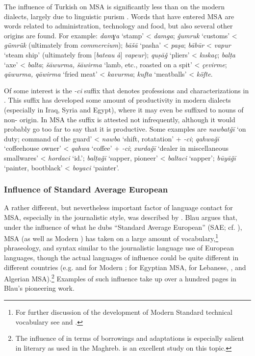 \documentclass[output=paper]{langsci/langscibook}
\begin{document}
The influence of  {Turkish} on MSA is significantly less than on the modern  dialects, largely due to linguistic purism \citep{Procházka2011Turkish}. Words that have entered MSA are words related to administration, technology and food, but also several other origins are found. For example: \textit{damɣa} ‘stamp’ < \textit{damga}; \textit{ǧumruk} ‘customs’ < \textit{gümrük} (ultimately from  \textit{commercium}); \textit{bāšā} ‘pasha’ < \textit{paşa}; \textit{bābūr} < \textit{vapur} ‘steam ship’ (ultimately from  [\textit{bateau} \textit{à}] \textit{vapeur}); \textit{quṣāǧ} ‘pliers’ < \textit{kıskaç}; \textit{balṭa} ‘axe’ < \textit{balta}; \textit{šāwurma,} \textit{šāwirma} ‘lamb, etc., roasted on a spit’ < \textit{çevirme}; \textit{qāwurma,} \textit{qāwirma} ‘fried meat’ < \textit{kavurma}; \textit{kufta} ‘meatballs’ < \textit{köfte}.

Of some interest is the \textit{-ci} suffix that denotes professions and characterizations in . This suffix has developed some amount of productivity in modern dialects (especially in Iraq, Syria and Egypt), where it may even be suffixed to nouns of non- origin. In MSA the suffix is attested not infrequently, although it would probably go too far to say that it is productive. Some examples are \textit{nawbatǧī} ‘on duty; command of the guard’ < \textit{nawba} ‘shift, rotatation’ + \textit{-ci}; \textit{qahwaǧī} ‘coffeehouse owner’ < \textit{qahwa} ‘coffee’ + \textit{-ci}; \textit{xurdaǧī} ‘dealer in miscellaneous smallwares’ < \textit{hordaci} ‘id.’; \textit{balṭaǧī} ‘sapper, pioneer’ < \textit{baltaci} ‘sapper’; \textit{būyāǧī} ‘painter, bootblack’ < \textit{boyaci} ‘painter’.

\subsubsection{Influence of Standard Average European}

A rather different, but nevertheless important factor of language contact for MSA, especially in the journalistic style, was described by \citet{Blau1969}. Blau argues that, under the influence of what he dubs “Standard Average European” (SAE; cf. \citealt{Whorf1956}), MSA (as well as Modern ) has taken on a large amount of vocabulary,\footnote{For further discussion of the development of Modern Standard  technical vocabulary see \citet{Dichy2011} and \citet{Jacquart94}.} phraseology, and syntax similar to the journalistic language use of European languages, though the actual languages of influence could be quite different in different countries (e.g.  and  for Modern ;  for Egyptian MSA,  for Lebanese, ,  and Algerian MSA).\footnote{The influence of  in terms of borrowings and adaptations is especially salient in literary  as used in the Maghreb. \citet{Kropftisch1977} is an excellent study on this topic.} Examples of such influence take up over a hundred pages in Blau’s pioneering work.
\end{document}
